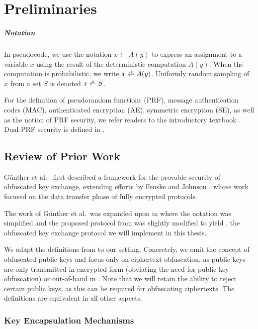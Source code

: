 \chapter{Preliminaries}\label{ch:preliminaries}

\paragraph{Notation}
In pseudocode, we use the notation $x \gets A(y)$ to express an assignment to a variable $x$ using the result of the deterministic computation $A(y)$. When the computation is probabilistic, we write $x \getsr A(y)$.
Uniformly random sampling of $x$ from a set $S$ is denoted $x \getsr S$.

For the definition of pseudorandom functions (PRF), message authentication codes (MAC), authenticated encryption (AE), symmetric encryption (SE), as well as the notion of PRF security, we refer readers to the introductory textbook \cite{katz_lindell}.
Dual-PRF security is defined in \cite[Section~7.1]{CCS:GunSteVei24}.

\section{Review of Prior Work} \label{sec:review-gsv24}

Günther et al.~\cite{CCS:GunSteVei24} first described a framework for the provable security of obfuscated key exchange, extending efforts by Fenske and Johnson \cite{CCS:FenJoh24}, whose work focused on the data transfer phase of fully encrypted protocols.

The work of Günther et al.~was expanded upon in \cite{EPRINT:GRSV25} where the notation was simplified and the proposed protocol from \cite{CCS:GunSteVei24} was slightly modified to yield \drivel{}, the obfuscated key exchange protocol we will implement in this thesis.

We adapt the definitions from \cite{CCS:GunSteVei24,EPRINT:GRSV25} to our setting. Concretely, we omit the concept of obfuscated public keys and focus only on ciphertext obfuscation, as public keys are only transmitted in encrypted form (obviating the need for public-key obfuscation) or out-of-band in \drivel{}. Note that we will retain the ability to reject certain public keys, as this can be required for obfuscating ciphertexts. The definitions are equivalent in all other aspects.

\subsection{Key Encapsulation Mechanisms}

